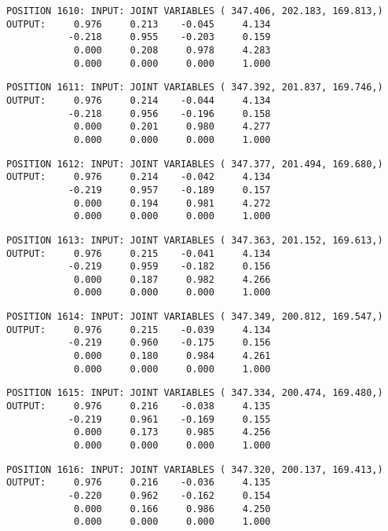 \begin{verbatim}
POSITION 1610: INPUT: JOINT VARIABLES ( 347.406, 202.183, 169.813,)
OUTPUT:     0.976     0.213    -0.045     4.134
           -0.218     0.955    -0.203     0.159
            0.000     0.208     0.978     4.283
            0.000     0.000     0.000     1.000
\end{verbatim} \pagebreak[1]\begin{verbatim}
POSITION 1611: INPUT: JOINT VARIABLES ( 347.392, 201.837, 169.746,)
OUTPUT:     0.976     0.214    -0.044     4.134
           -0.218     0.956    -0.196     0.158
            0.000     0.201     0.980     4.277
            0.000     0.000     0.000     1.000
\end{verbatim} \pagebreak[1]\begin{verbatim}
POSITION 1612: INPUT: JOINT VARIABLES ( 347.377, 201.494, 169.680,)
OUTPUT:     0.976     0.214    -0.042     4.134
           -0.219     0.957    -0.189     0.157
            0.000     0.194     0.981     4.272
            0.000     0.000     0.000     1.000
\end{verbatim} \pagebreak[1]\begin{verbatim}
POSITION 1613: INPUT: JOINT VARIABLES ( 347.363, 201.152, 169.613,)
OUTPUT:     0.976     0.215    -0.041     4.134
           -0.219     0.959    -0.182     0.156
            0.000     0.187     0.982     4.266
            0.000     0.000     0.000     1.000
\end{verbatim} \pagebreak[1]\begin{verbatim}
POSITION 1614: INPUT: JOINT VARIABLES ( 347.349, 200.812, 169.547,)
OUTPUT:     0.976     0.215    -0.039     4.134
           -0.219     0.960    -0.175     0.156
            0.000     0.180     0.984     4.261
            0.000     0.000     0.000     1.000
\end{verbatim} \pagebreak[1]\begin{verbatim}
POSITION 1615: INPUT: JOINT VARIABLES ( 347.334, 200.474, 169.480,)
OUTPUT:     0.976     0.216    -0.038     4.135
           -0.219     0.961    -0.169     0.155
            0.000     0.173     0.985     4.256
            0.000     0.000     0.000     1.000
\end{verbatim} \pagebreak[1]\begin{verbatim}
POSITION 1616: INPUT: JOINT VARIABLES ( 347.320, 200.137, 169.413,)
OUTPUT:     0.976     0.216    -0.036     4.135
           -0.220     0.962    -0.162     0.154
            0.000     0.166     0.986     4.250
            0.000     0.000     0.000     1.000
\end{verbatim} \pagebreak[1]\begin{verbatim}

\end{verbatim}
